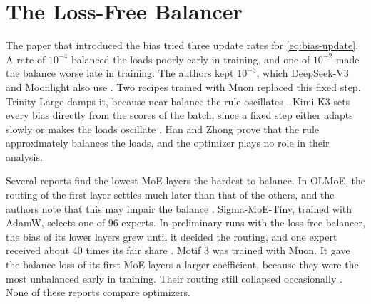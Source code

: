 \section{The Loss-Free Balancer}
\label{sec:related-balancer}
The paper that introduced the bias tried three update rates for \cref{eq:bias-update}. A rate of $10^{-4}$ balanced the loads poorly early in training, and one of $10^{-2}$ made the balance worse late in training. The authors kept $10^{-3}$, which DeepSeek-V3 and Moonlight also use \cite{wang2024lossfree, deepseek2024v3, liu2025moonlight}. Two recipes trained with Muon replaced this fixed step. Trinity Large damps it, because near balance the rule oscillates \cite{singh2026trinity}. Kimi K3 sets every bias directly from the scores of the batch, since a fixed step either adapts slowly or makes the loads oscillate \cite{kimi2026k3}. Han and Zhong \cite{han2025lossfree} prove that the rule approximately balances the loads, and the optimizer plays no role in their analysis.

Several reports find the lowest MoE layers the hardest to balance. In OLMoE, the routing of the first layer settles much later than that of the others, and the authors note that this may impair the balance \cite{muennighoff2025olmoe}. Sigma-MoE-Tiny, trained with AdamW, selects one of 96 experts. In preliminary runs with the loss-free balancer, the bias of its lower layers grew until it decided the routing, and one expert received about 40 times its fair share \cite{hu2025sigmamoe}. Motif 3 was trained with Muon. It gave the balance loss of its first MoE layers a larger coefficient, because they were the most unbalanced early in training. Their routing still collapsed occasionally \cite{motif2026motif3}. None of these reports compare optimizers.

